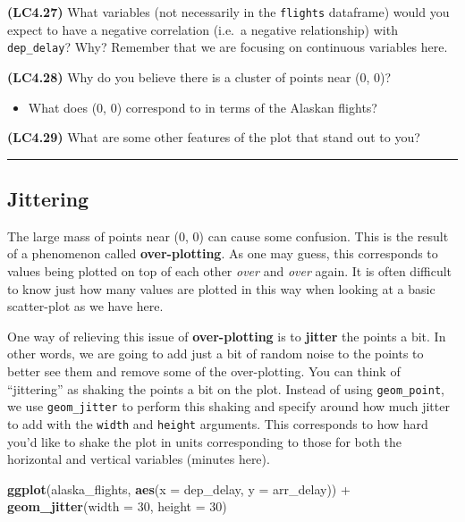 \documentclass[]{tufte-book}
\newenvironment{Shaded}{\begin{snugshade}}{\end{snugshade}}
\newcommand{\KeywordTok}[1]{\textcolor[rgb]{0.13,0.29,0.53}{\textbf{{#1}}}}
\newcommand{\DataTypeTok}[1]{\textcolor[rgb]{0.13,0.29,0.53}{{#1}}}
\newcommand{\DecValTok}[1]{\textcolor[rgb]{0.00,0.00,0.81}{{#1}}}
\newcommand{\StringTok}[1]{\textcolor[rgb]{0.31,0.60,0.02}{{#1}}}
\newcommand{\NormalTok}[1]{{#1}}
\providecommand{\tightlist}{%
  \setlength{\itemsep}{0pt}\setlength{\parskip}{0pt}}
\begin{document}
\textbf{(LC4.27)} What variables (not necessarily in the
\texttt{flights} dataframe) would you expect to have a negative
correlation (i.e.~a negative relationship) with \texttt{dep\_delay}?
Why? Remember that we are focusing on continuous variables here.

\textbf{(LC4.28)} Why do you believe there is a cluster of points near
(0, 0)?

\begin{itemize}
\tightlist
\item
  What does (0, 0) correspond to in terms of the Alaskan flights?
\end{itemize}

\textbf{(LC4.29)} What are some other features of the plot that stand
out to you?

\begin{center}\rule{\linewidth}{\linethickness}\end{center}

\subsection{Jittering}\label{jittering}

The large mass of points near (0, 0) can cause some confusion. This is
the result of a phenomenon called \textbf{over-plotting}. As one may
guess, this corresponds to values being plotted on top of each other
\emph{over} and \emph{over} again. It is often difficult to know just
how many values are plotted in this way when looking at a basic
scatter-plot as we have here.

One way of relieving this issue of \textbf{over-plotting} is to
\textbf{jitter} the points a bit. In other words, we are going to add
just a bit of random noise to the points to better see them and remove
some of the over-plotting. You can think of ``jittering'' as shaking the
points a bit on the plot. Instead of using \texttt{geom\_point}, we use
\texttt{geom\_jitter} to perform this shaking and specify around how
much jitter to add with the \texttt{width} and \texttt{height}
arguments. This corresponds to how hard you'd like to shake the plot in
units corresponding to those for both the horizontal and vertical
variables (minutes here).

\begin{Shaded}
\begin{Highlighting}[]
\KeywordTok{ggplot}\NormalTok{(alaska_flights, }\KeywordTok{aes}\NormalTok{(}\DataTypeTok{x =} \NormalTok{dep_delay, }\DataTypeTok{y =} \NormalTok{arr_delay)) +}\StringTok{ }
\StringTok{  }\KeywordTok{geom_jitter}\NormalTok{(}\DataTypeTok{width =} \DecValTok{30}\NormalTok{, }\DataTypeTok{height =} \DecValTok{30}\NormalTok{)}
\end{Highlighting}
\end{Shaded}
\end{document}
